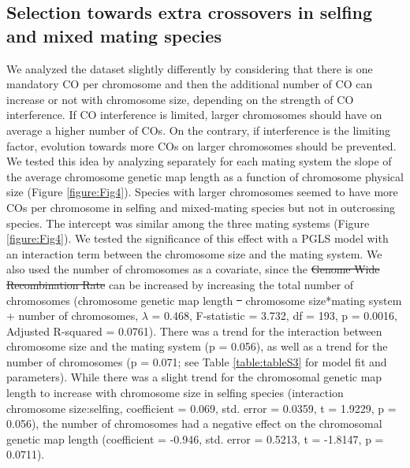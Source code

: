 \documentclass{article}
\providecommand{\DIFaddtex}[1]{{\protect\color{blue}\uwave{#1}}} %
\providecommand{\DIFdeltex}[1]{{\protect\color{red}\sout{#1}}}                      %
\providecommand{\DIFaddbegin}{} %
\providecommand{\DIFaddend}{} %
\providecommand{\DIFdelbegin}{} %
\providecommand{\DIFdelend}{} %
\providecommand{\DIFadd}[1]{\texorpdfstring{\DIFaddtex{#1}}{#1}} %
\providecommand{\DIFdel}[1]{\texorpdfstring{\DIFdeltex{#1}}{}} %
\newcommand{\DIFscaledelfig}{0.5}
\newlength{\DIFdelgraphicswidth} %
\newlength{\DIFdelgraphicsheight} %
\newcommand{\DIFaddincludegraphics}[2][]{{\color{blue}\fbox{\DIFOincludegraphics[#1]{#2}}}} %
\newcommand{\DIFdelincludegraphics}[2][]{%
\sbox{\DIFdelgraphicsbox}{\DIFOincludegraphics[#1]{#2}}%
\settoboxwidth{\DIFdelgraphicswidth}{\DIFdelgraphicsbox} %
\settoboxtotalheight{\DIFdelgraphicsheight}{\DIFdelgraphicsbox} %
\scalebox{\DIFscaledelfig}{%
\parbox[b]{\DIFdelgraphicswidth}{\usebox{\DIFdelgraphicsbox}\\[-\baselineskip] \rule{\DIFdelgraphicswidth}{0em}}\llap{\resizebox{\DIFdelgraphicswidth}{\DIFdelgraphicsheight}{%
\setlength{\unitlength}{\DIFdelgraphicswidth}%
\begin{picture}(1,1)%
\thicklines\linethickness{2pt} %
{\color[rgb]{1,0,0}\put(0,0){\framebox(1,1){}}}%
{\color[rgb]{1,0,0}\put(0,0){\line( 1,1){1}}}%
{\color[rgb]{1,0,0}\put(0,1){\line(1,-1){1}}}%
\end{picture}%
}\hspace*{3pt}}} %
} %
\DeclareRobustCommand{\DIFaddbegin}{\DIFOaddbegin \let\includegraphics\DIFaddincludegraphics} %
\DeclareRobustCommand{\DIFaddend}{\DIFOaddend \let\includegraphics\DIFOincludegraphics} %
\DeclareRobustCommand{\DIFdelbegin}{\DIFOdelbegin \let\includegraphics\DIFdelincludegraphics} %
\DeclareRobustCommand{\DIFdelend}{\DIFOaddend \let\includegraphics\DIFOincludegraphics} %
\begin{document}
\subsection*{Selection towards extra crossovers in selfing and mixed mating species}


We analyzed the dataset slightly differently by considering that there is one mandatory CO per chromosome and then the additional number of CO can increase or not with chromosome size, depending on the strength of CO interference. If CO interference is limited, larger chromosomes should have on average a higher number of COs. On the contrary, if interference is the limiting factor, evolution towards more COs on larger chromosomes should be prevented. We tested this idea by analyzing separately for each mating system the slope of the average chromosome genetic map length as a function of chromosome physical size (Figure \ref{figure:Fig4}). Species with larger chromosomes seemed to have more COs per chromosome in selfing and mixed-mating species but not in outcrossing species. The intercept was similar among the three mating systems (Figure \ref{figure:Fig4}). We tested the significance of this effect with a PGLS model with an interaction term between the chromosome size and the mating system. We also used the number of chromosomes as a covariate, since the \DIFdelbegin \DIFdel{Genome Wide Recombination Rate }\DIFdelend \DIFaddbegin \DIFadd{genome-wide recombination rate }\DIFaddend can be increased by increasing the total number of chromosomes (chromosome genetic map length \DIFdelbegin \DIFdel{~ }\DIFdelend \DIFaddbegin \DIFadd{= }\DIFaddend chromosome size*mating system + number of chromosomes, $\lambda$ = 0.468, F-statistic = 3.732, df = 193, p = 0.0016, Adjusted R-squared = 0.0761). There was a trend for the interaction between chromosome size and the mating system (p = 0.056), as well as a trend for the number of chromosomes (p = 0.071; see Table \ref{table:tableS3} for model fit and parameters). While there was a slight trend for the chromosomal genetic map length to increase with chromosome size in selfing species (interaction chromosome size:selfing, coefficient = 0.069, std. error = 0.0359, t = 1.9229, p = 0.056), the number of chromosomes had a negative effect on the chromosomal genetic map length (coefficient = -0.946, std. error = 0.5213, t = -1.8147, p = 0.0711).
\end{document}
